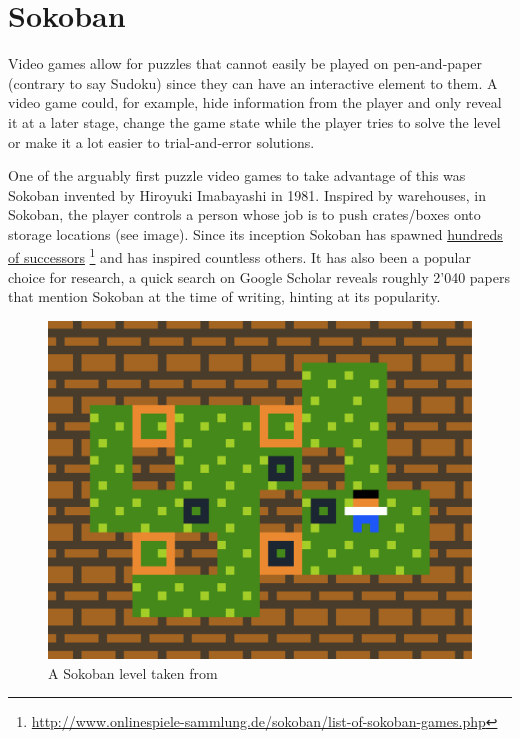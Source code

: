 


\section{Sokoban}

Video games allow for puzzles that cannot easily be played on pen-and-paper (contrary to say Sudoku) since they can have an interactive element to them. A video game could, for example, hide information from the player and only reveal it at a later stage, change the game state while the player tries to solve the level or make it a lot easier to trial-and-error solutions.


One of the arguably first puzzle video games to take advantage of this was Sokoban invented by Hiroyuki Imabayashi in 1981. Inspired by warehouses, in Sokoban, the player controls a person whose job is to push crates/boxes onto storage locations (see image). Since its inception Sokoban has spawned \href{http://www.onlinespiele-sammlung.de/sokoban/list-of-sokoban-games.php}{hundreds of successors} \footnote{\url{http://www.onlinespiele-sammlung.de/sokoban/list-of-sokoban-games.php}} and has inspired countless others. It has also been a popular choice for research, a quick search on Google Scholar reveals roughly 2'040 papers that mention Sokoban at the time of writing, hinting at its popularity.

\begin{figure}[h]
    \centering
    \setlength{\tabcolsep}{0.0130\linewidth}
    \includegraphics[width=0.487\linewidth]{figures/45minslevel.png}
    
    \caption[43 Minute Sokoban level]{A Sokoban level taken from \cite{Pelanek2011} %
      \label{fig:43minsfig}}
\end{figure}

